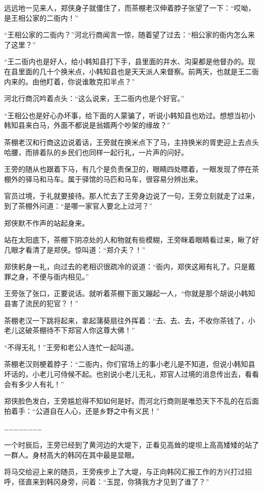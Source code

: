 远远地一见来人，郑侠身子就僵住了，而茶棚老汉伸着脖子张望了一下：“哎呦，是王相公家的二衙内！”

“王相公家的二衙内？”河北行商闻言一惊，随着望了过去：“相公家的衙内怎么来了这里？”

“王二衙内也是好人，给小韩知县打下手，县里面的井水、沟渠都是他督办的。现在县里面的几十个换米点，小韩知县也是天天派人来督察。前两天，也就是王二衙内来的。由他盯着，你说谁敢克扣半点？”

河北行商沉吟着点头：“这么说来，王二衙内也是个好官。”

“王相公也是好心办坏事，给下面的人蒙骗了，听说小韩知县也劝过。想想当初小韩知县来白马，外面不都说是翁婿两个吵架的缘故？”

茶棚老汉和行商这边说着话，王旁就在换米点下了马，主持换米的胥吏迎上去点头哈腰，而排着队的乡民们也同样一起行礼，一片声的问好。

王旁的随从也跟着下马，有几个是负责保卫的，眼睛四处瞟着，一眼发现了停在茶棚外的驿马和马车。属于驿馆的马匹和马车，很容易分辨出来。

官员过境，于礼就要接待。那人忙去了王旁身边说了一句，王旁立刻就走了过来，到了茶棚外问道：“是哪一家官人要北上过河？”

郑侠默不作声的站起身来。

站在太阳底下，茶棚下阴凉处的人和物就有些模糊，王旁眯着眼睛看过来，瞅了好几眼才看清了是郑侠。惊叫道：“郑介夫？！”

郑侠躬身一礼，向过去的老相识很疏冷的说道：“衙内，郑侠这厢有礼了。只是戴罪之身，不便与衙内相见。”

王旁张了张口，正要说话。就听着茶棚下面又蹦起一人，“你就是那个胡说小韩知县害了流民的犯官？！”

茶棚老汉一下跳将起来，拿起蒲葵扇往外挥着：“去、去、去，不收你茶钱了，小老儿这破茶棚待不下郑官人你这尊大佛！”

“不得无礼！”王旁和老公人连忙一起叫道。

茶棚老汉则梗着脖子：“二衙内，你们官场上的事小老儿是不知道，但说小韩知县坏话的，小老儿可侍候不起。也别说小老儿无礼，郑官人过境的消息传出去，看看会有多少人有礼！”

郑侠脸色发白，王旁尴尬得不知如何是好。而河北行商则是唯恐天下不乱的在后面拍着手：“公道自在人心，还是乡野之中有义民！”

……………………

一个时辰后，王旁已经到了黄河边的大堤下，正看见高耸的堤坝上高高矮矮的站了一群人。身材高大的韩冈在其中最是显眼。

将马交给迎上来的随员，王旁疾步上了大堤，与正向韩冈汇报工作的方兴打过招呼，径直来到韩冈身旁，问着：“玉昆，你猜我方才见到了谁了？”

